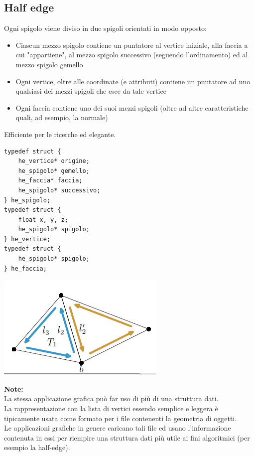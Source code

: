 \documentclass[a4paper, 10pt]{article}
\begin{document}
	\subsection{Half edge}
		Ogni spigolo viene diviso in due spigoli
		orientati in modo opposto:
		\begin{itemize}
			\item Ciascun mezzo spigolo contiene un puntatore
			al vertice iniziale, alla faccia a cui "appartiene",
			al mezzo spigolo successivo (seguendo
			l’ordinamento) ed al mezzo spigolo gemello
			\item Ogni vertice, oltre alle coordinate (e attributi)
			contiene un puntatore ad uno qualsiasi dei
			mezzi spigoli che esce da tale vertice
			\item Ogni faccia contiene uno dei suoi mezzi spigoli
			(oltre ad altre caratteristiche quali, ad
			esempio, la normale)
		\end{itemize}
		Efficiente per le ricerche ed elegante.
		
		\begin{multicols}{2}		
	\begin{lstlisting}
typedef struct {
	he_vertice* origine;
	he_spigolo* gemello;
	he_faccia* faccia;
	he_spigolo* successivo;
} he_spigolo;
typedef struct {
	float x, y, z;
	he_spigolo* spigolo;
} he_vertice;
typedef struct {
	he_spigolo* spigolo;
} he_faccia;
	\end{lstlisting}
		
		\columnbreak
		
		\vspace*{1cm}
		\includegraphics[scale=0.5]{mesh2}
	\end{multicols}
		
	\noindent
	\textbf{Note:}\\
	La stessa applicazione grafica può far uso di più di una
	struttura dati.\\
	La rappresentazione con la lista di vertici essendo semplice e
	leggera è tipicamente usata come formato per i file
	contenenti la geometria di oggetti.\\
	Le applicazioni grafiche in genere caricano tali file ed usano
	l’informazione contenuta in essi per riempire una struttura
	dati più utile ai fini algoritmici (per esempio la half-edge).
	
\end{document}

